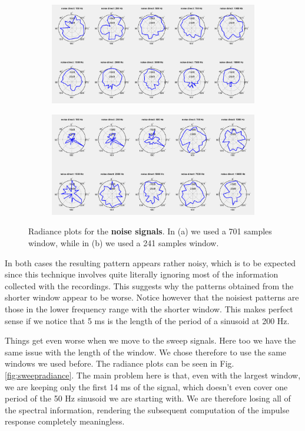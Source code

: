 \documentclass[a4paper]{article}
\begin{document}
\begin{figure}[h]
	\centering
	\begin{subfigure}{0.85\linewidth}
		\centering
		\includegraphics[width=\linewidth]{4a_radiance.png}
		\caption{}
	\end{subfigure}

	\begin{subfigure}{0.85\linewidth}
		\centering
		\includegraphics[width=\linewidth]{4a_radiance_120.png}
		\caption{}
	\end{subfigure}
	\caption{Radiance plots for the \textbf{noise signals}. In (a) we used a 701 samples window, while in (b) we used a 241 samples window.}
	\label{fig:noiseradiance}
\end{figure}

In both cases the resulting pattern appears rather noisy, which is to be expected since this technique involves quite literally ignoring most of the information collected with the recordings. This suggests why the patterns obtained from the shorter window appear to be worse. Notice however that the noisiest patterns are those in the lower frequency range with the shorter window. This makes perfect sense if we notice that 5 ms is the length of the period of a sinusoid at 200 Hz.

Things get even worse when we move to the sweep signals. Here too we have the same issue with the length of the window. We chose therefore to use the same windows we used before. The radiance plots can be seen in Fig. \ref{fig:sweepradiance}. The main problem here is that, even with the largest window, we are keeping only the first 14 ms of the signal, which doesn't even cover one period of the 50 Hz sinusoid we are starting with. We are therefore losing all of the spectral information, rendering the subsequent computation of the impulse response completely meaningless.
\end{document}
